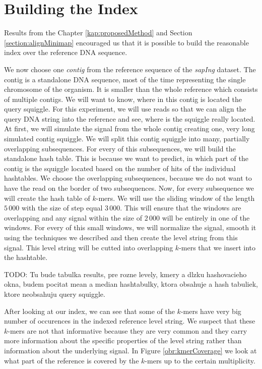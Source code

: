 \section{Building the Index}

Results from the Chapter \ref{kap:proposedMethod} and Section \ref{section:alignMinimap}
encouraged us that it is possible to build the reasonable index over the reference
DNA sequence.

We now choose one \textit{contig} from the reference sequence of the \textit{sapIng}
dataset. The contig is a standalone DNA sequence, most of the time representing the single chromosome
of the organism. It is smaller than the whole reference which consists of multiple contigs.
We will want to know, where in this contig is located the query squiggle. For this experiment, we will use
reads so that we can align the query DNA string into the reference and see, where is
the squiggle really located. At first, we will simulate the signal from the whole contig creating
one, very long simulated contig squiggle. We will split this contig squiggle into many, partially overlapping
subsequences. For every of this subsequences, we will build the standalone hash table.
This is because we want to predict, in which part of the contig is the squiggle
located based on the number of hits of the individual hashtables. We choose the overlapping
subsequences, because we do not want to have the read on the border of two subsequences.
Now, for every subsequence we will create the hash table of $k$-mers. We will use the sliding
window of the length $5\,000$ with the size of step equal $3\,000$. This will ensure that
the windows are overlapping and any signal within the size of $2\,000$ will be entirely
in one of the windows. For every of this small windows, we will normalize the signal, smooth
it using the techniques we described and then create the level string from this signal.
This level string will be cutted into overlapping $k$-mers that we insert into the
hashtable.

TODO: Tu bude tabulka results, pre rozne levely, kmery a dlzku hashovacieho okna,
budem pocitat mean a median hashtabulky, ktora obsahuje a hash tabuliek, ktore neobsahuju
query squiggle.

After looking at our index, we can see that some of the $k$-mers have very big
number of occurences in the indexed reference level string. We suspect that these
$k$-mers are not that informative because they are very common and they carry more
information about the specific properties of the level string rather than information
about the underlying signal. In Figure \ref{obr:kmerCoverage} we look at what part of the
reference is covered by the $k$-mers up to the certain multiplicity.

